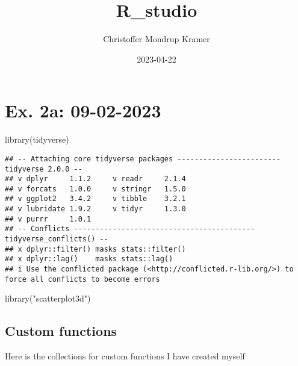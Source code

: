\documentclass[
]{article}
\title{R\_studio}
\author{Christoffer Mondrup Kramer}
\date{2023-04-22}
\newenvironment{Shaded}{\begin{snugshade}}{\end{snugshade}}
\newcommand{\FunctionTok}[1]{\textcolor[rgb]{0.00,0.00,0.00}{#1}}
\newcommand{\NormalTok}[1]{#1}
\newcommand{\StringTok}[1]{\textcolor[rgb]{0.31,0.60,0.02}{#1}}
\begin{document}
\maketitle

\hypertarget{ex.-2a-09-02-2023}{%
\section{Ex. 2a: 09-02-2023}\label{ex.-2a-09-02-2023}}

\begin{Shaded}
\begin{Highlighting}[]
\FunctionTok{library}\NormalTok{(tidyverse)}
\end{Highlighting}
\end{Shaded}

\begin{verbatim}
## -- Attaching core tidyverse packages ------------------------ tidyverse 2.0.0 --
## v dplyr     1.1.2     v readr     2.1.4
## v forcats   1.0.0     v stringr   1.5.0
## v ggplot2   3.4.2     v tibble    3.2.1
## v lubridate 1.9.2     v tidyr     1.3.0
## v purrr     1.0.1     
## -- Conflicts ------------------------------------------ tidyverse_conflicts() --
## x dplyr::filter() masks stats::filter()
## x dplyr::lag()    masks stats::lag()
## i Use the conflicted package (<http://conflicted.r-lib.org/>) to force all conflicts to become errors
\end{verbatim}

\begin{Shaded}
\begin{Highlighting}[]
\FunctionTok{library}\NormalTok{(}\StringTok{"scatterplot3d"}\NormalTok{)}
\end{Highlighting}
\end{Shaded}

\hypertarget{custom-functions}{%
\subsection{Custom functions}\label{custom-functions}}

Here is the collections for custom functions I have created myself
\end{document}
